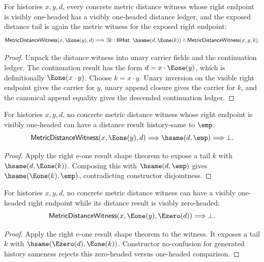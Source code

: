 \begin{theorem}
\label{thm:metric-distance-witness-right-e1-result-shape}
For histories $x,y,d$, every concrete metric distance witness whose right
endpoint is visibly one-headed has a visibly one-headed distance ledger, and
the exposed distance tail is again the metric witness for the exposed right
endpoint:
$$
\mathsf{MetricDistanceWitness}(x,\Eone(y),d)
\Longrightarrow
\exists k:\mathsf{BHist}.\;
\hsame(d,\Eone(k))\land
\mathsf{MetricDistanceWitness}(x,y,k).
$$
\end{theorem}
\begin{proof}
Unpack the distance witness into unary carrier fields and the continuation
ledger. The continuation result has the form
$d=x\cdot\Eone(y)$, which is definitionally
$\Eone(x\cdot y)$. Choose $k=x\cdot y$. Unary inversion on the visible right
endpoint gives the carrier for $y$, unary append closure gives the carrier for
$k$, and the canonical append equality gives the descended continuation
ledger.
\end{proof}

\begin{theorem}
\label{thm:metric-distance-witness-right-e1-result-not-empty}
For histories $x,y,d$, no concrete metric distance witness whose right endpoint
is visibly one-headed can have a distance result history-same to $\emp$:
$$
\mathsf{MetricDistanceWitness}(x,\Eone(y),d)
\Longrightarrow
\hsame(d,\emp)\Longrightarrow \bot.
$$
\end{theorem}
\begin{proof}
Apply the right e-one result shape theorem to expose a tail $k$ with
$\hsame(d,\Eone(k))$. Composing this with $\hsame(d,\emp)$ gives
$\hsame(\Eone(k),\emp)$, contradicting constructor disjointness.
\end{proof}

\begin{theorem}
\label{thm:metric-distance-witness-right-e1-result-e0-absurd}
For histories $x,y,d$, no concrete metric distance witness can have a visibly
one-headed right endpoint while its distance result is visibly zero-headed:
$$
\mathsf{MetricDistanceWitness}(x,\Eone(y),\Ezero(d))
\Longrightarrow \bot.
$$
\end{theorem}
\begin{proof}
Apply the right e-one result shape theorem to the witness. It exposes a tail
$k$ with $\hsame(\Ezero(d),\Eone(k))$. Constructor no-confusion for generated
history sameness rejects this zero-headed versus one-headed comparison.
\end{proof}

